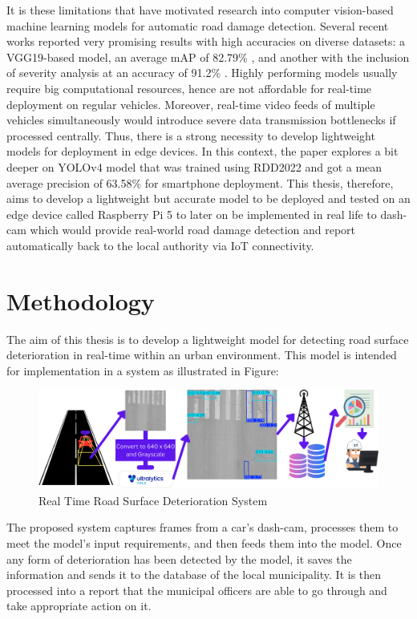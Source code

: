 It is these limitations that have motivated research into computer vision-based machine learning models for automatic road damage detection. Several recent works reported very promising results with high accuracies on diverse datasets: a VGG19-based model, an average mAP of 82.79\% \cite{Ale2018}, and another with the inclusion of severity analysis at an accuracy of 91.2\% \cite{Ha2022}. Highly performing models usually require big computational resources, hence are not affordable for real-time deployment on regular vehicles. Moreover, real-time video feeds of multiple vehicles simultaneously would introduce severe data transmission bottlenecks if processed centrally. Thus, there is a strong necessity to develop lightweight models for deployment in edge devices. In this context, the paper explores a bit deeper on YOLOv4 model that was trained using RDD2022 and got a mean average precision of 63.58\% for smartphone deployment\cite{Doshi2020}.
This thesis, therefore, aims to develop a lightweight but accurate model to be deployed and tested on an edge device called Raspberry Pi 5 to later on be implemented in real life to dash-cam which would provide real-world road damage detection and report automatically back to the local authority via IoT connectivity.



\section{Methodology} \label{meth}
The aim of this thesis is to develop a lightweight model for detecting road surface deterioration in real-time within an urban environment. This model is intended for implementation in a system as illustrated in Figure:
\begin{figure}[h]
    \centering
    \includegraphics[width=1\linewidth]{figures/final_system.png}
    \caption{Real Time Road Surface Deterioration System}
    \label{fig:fdbifb-label}
\end{figure}
\newline
The proposed system captures frames from a car's dash-cam, processes them to meet the model's input requirements, and then feeds them into the model.  Once any form of deterioration has been detected by the model, it saves the information and sends it to the database of the local municipality. It is then processed into a report that the municipal officers are able to go through and take appropriate action on it.

